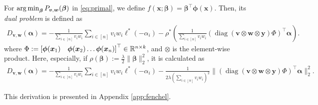 \begin{definition} \label{def:dual}
For $\operatorname*{arg\,min}_{\bm\beta} P_{\bm v,\bm w}(\bm \beta)$ in \eqref{eq:primal}, we define $f(\bm x; \bm\beta) = \bm{\beta}^\top \bm\phi(\bm x)$. Then, its {\em dual problem} is defined as
\begin{align}
\label{eq:dual}
D_{\bm v,\bm w}(\bm\alpha) = - \frac{1}{\sum_{i\in[n]} v_i w_i}\sum_{i\in[n]} v_i w_i \ell^*(-\alpha_i) - \rho^*\left(\frac{1}{\sum_{i\in[n]} v_i w_i}(\operatorname{diag}(\bm v\otimes\bm w \otimes \bm y) \Phi)^\top\bm\alpha \right).
\end{align}
where $\Phi:=\left[\bm\phi(\bm x_1)\quad\bm\phi(\bm x_2) \ldots \bm\phi(\bm x_n)\right]^{\top} \in \mathbb{R}^{n\times k}$, {and $\otimes$ is the element-wise product}.
%
Here, especially, if $\rho(\bm\beta) := \frac{\lambda}{2}\|\bm\beta\|_2^2$, it is calculated as
\begin{align}
D_{\bm v,\bm w}(\bm\alpha) = - \frac{1}{\sum_{i\in[n]} v_i w_i}\sum_{i\in[n]} v_i w_i \ell^*(-\alpha_i) - \frac{1}{2\lambda\left(\sum_{i\in[n]} v_i w_i\right)^2}\| (\operatorname{diag}(\bm v\otimes\bm w \otimes \bm y) \Phi)^\top\bm\alpha \|_2^2.
\end{align}
\end{definition}
This derivation is presented in Appendix \ref{app:fenchel}.


